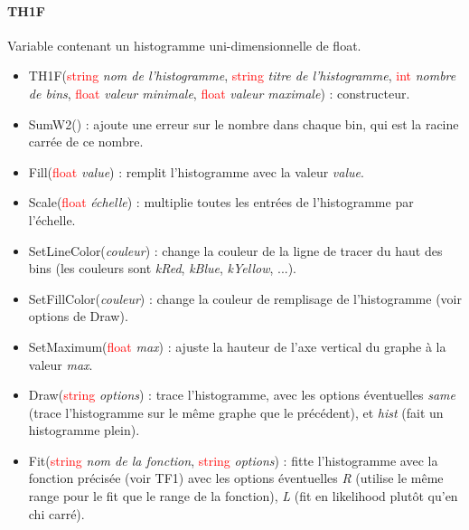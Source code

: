 \documentclass[a4paper]{report}
\begin{document}
\paragraph{TH1F}
Variable contenant un histogramme uni-dimensionnelle de float.
  \begin{itemize}
  \item TH1F(\textcolor{red}{string} \textit{nom de l'histogramme}, \textcolor{red}{string} \textit{titre de l'histogramme}, \textcolor{red}{int} \textit{nombre de bins}, \textcolor{red}{float} \textit{valeur minimale}, \textcolor{red}{float} \textit{valeur maximale}) : constructeur.
  \item SumW2() : ajoute une erreur sur le nombre dans chaque bin, qui est la racine carr\'{e}e de ce nombre.
  \item Fill(\textcolor{red}{float} \textit{value}) : remplit l'histogramme avec la valeur \textit{value}.
  \item Scale(\textcolor{red}{float} \textit{\'{e}chelle}) : multiplie toutes les entr\'{e}es de l'histogramme par l'\'{e}chelle.
  \item SetLineColor(\textit{couleur}) : change la couleur de la ligne de tracer du haut des bins (les couleurs sont \textit{kRed}, \textit{kBlue}, \textit{kYellow}, ...).
  \item SetFillColor(\textit{couleur}) : change la couleur de remplisage de l'histogramme (voir options de Draw).
  \item SetMaximum(\textcolor{red}{float} \textit{max}) : ajuste la hauteur de l'axe vertical du graphe \`{a} la valeur \textit{max}.
  \item Draw(\textcolor{red}{string} \textit{options}) : trace l'histogramme, avec les options \'{e}ventuelles \textit{same} (trace l'histogramme sur le m\^{e}me graphe que le pr\'{e}c\'{e}dent), et \textit{hist} (fait un histogramme plein).
  \item Fit(\textcolor{red}{string} \textit{nom de la fonction}, \textcolor{red}{string} \textit{options}) : fitte l'histogramme avec la fonction pr\'{e}cis\'{e}e (voir TF1) avec les options \'{e}ventuelles \textit{R} (utilise le m\^{e}me range pour le fit que le range de la fonction), \textit{L} (fit en likelihood plut\^{o}t qu'en chi carr\'{e}).
  \end{itemize}
\end{document}
